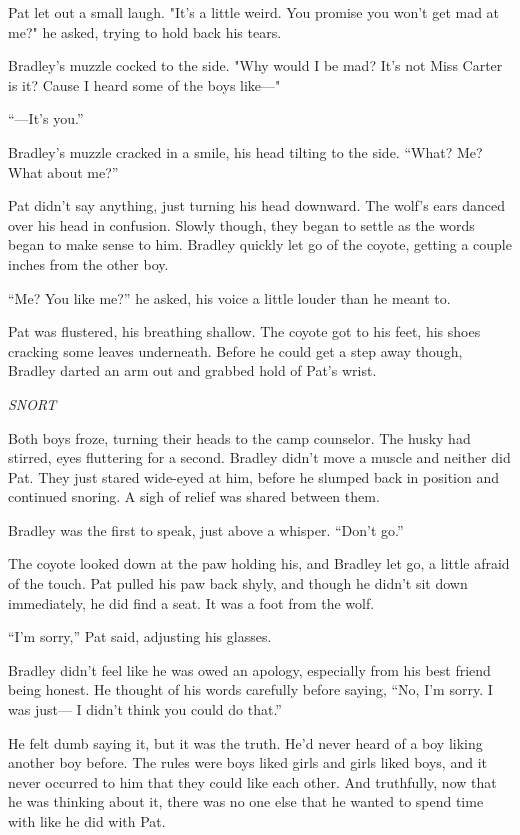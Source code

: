 Pat let out a small laugh. "It's a little weird. You promise you won't
get mad at me?" he asked, trying to hold back his tears.

Bradley's muzzle cocked to the side. "Why would I be mad? It's not Miss
Carter is it? Cause I heard some of the boys like---"

``---It's you.''

Bradley's muzzle cracked in a smile, his head tilting to the side.
``What? Me? What about me?''

Pat didn't say anything, just turning his head downward. The wolf's ears
danced over his head in confusion. Slowly though, they began to settle
as the words began to make sense to him. Bradley quickly let go of the
coyote, getting a couple inches from the other boy.

``Me? You like me?'' he asked, his voice a little louder than he meant to.

Pat was flustered, his breathing shallow. The coyote got to his feet,
his shoes cracking some leaves underneath. Before he could get a step
away though, Bradley darted an arm out and grabbed hold of Pat's wrist.

\emph{SNORT}

Both boys froze, turning their heads to the camp counselor. The husky
had stirred, eyes fluttering for a second. Bradley didn't move a muscle
and neither did Pat. They just stared wide-eyed at him, before he
slumped back in position and continued snoring. A sigh of relief was
shared between them.

Bradley was the first to speak, just above a whisper. ``Don't go.''

The coyote looked down at the paw holding his, and Bradley let go, a
little afraid of the touch. Pat pulled his paw back shyly, and though he
didn't sit down immediately, he did find a seat. It was a foot from the
wolf.

``I'm sorry,'' Pat said, adjusting his glasses.

Bradley didn't feel like he was owed an apology, especially from his
best friend being honest. He thought of his words carefully before
saying, ``No, I'm sorry. I was just--- I didn't think you could do that.''

He felt dumb saying it, but it was the truth. He'd never heard of a boy
liking another boy before. The rules were boys liked girls and girls
liked boys, and it never occurred to him that they could like each
other. And truthfully, now that he was thinking about it, there was no
one else that he wanted to spend time with like he did with Pat.

